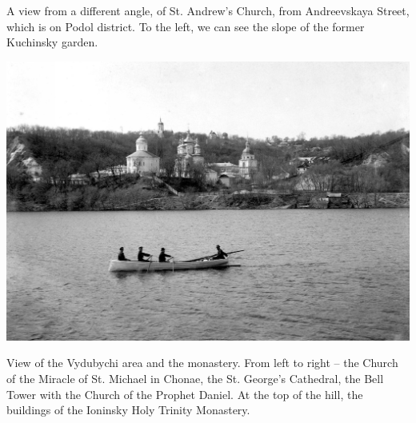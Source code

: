 \documentclass[a5paper,11pt,openany]{article}
\begin{document}
A view from a different angle, of St. Andrew's Church, from Andreevskaya Street, which is on Podol district. To the left, we can see the slope of the former Kuchinsky garden.

\vspace*{\fill}

\newpage

\vspace*{\fill}

\begin{center}
\includegraphics[width=\linewidth]{vyd01.jpg}
\end{center}

View of the Vydubychi area and the monastery. From left to right – the Church of the Miracle of St. Michael in Chonae, the St. George's Cathedral, the Bell Tower with the Church of the Prophet Daniel. At the top of the hill, the buildings of the Ioninsky Holy Trinity Monastery.

\vspace*{\fill}


\newpage




%

\begin{thebibliography}{999}

\end{thebibliography}
\end{document}
